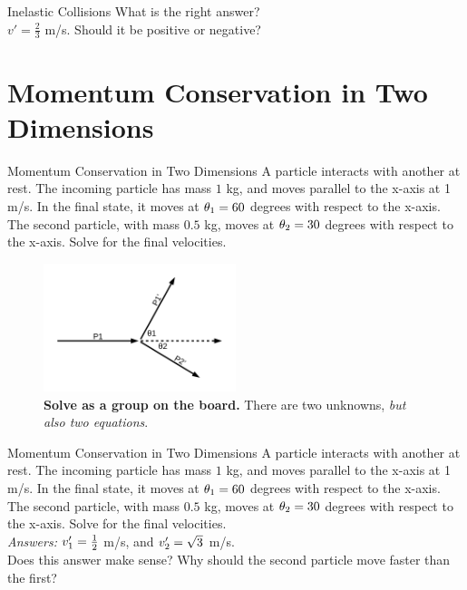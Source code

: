 \documentclass{beamer}
\begin{document}
\begin{frame}{Inelastic Collisions}
What is the right answer? \\ \vspace{0.5cm}
$v' = \frac{2}{3}$ m/s.  Should it be positive or negative?
\end{frame}

\section{Momentum Conservation in Two Dimensions}

\begin{frame}{Momentum Conservation in Two Dimensions}
\small
A particle interacts with another at rest.  The incoming particle has mass $1$ kg, and moves parallel to the x-axis at 1 m/s.  In the final state, it moves at $\theta_{\rm 1} = 60$ degrees with respect to the x-axis.  The second particle, with mass $0.5$ kg, moves at $\theta_{\rm 2} = 30$ degrees with respect to the x-axis.  Solve for the final velocities. \\ \vspace{0.5cm}
\begin{figure}
\centering
\includegraphics[width=0.5\textwidth]{figures/2d_1.pdf}
\caption{\label{fig:2d_1} \textbf{Solve as a group on the board.}  There are two unknowns, \alert{\textit{but also two equations}.}}
\end{figure}
\end{frame}

\begin{frame}{Momentum Conservation in Two Dimensions}
\small
A particle interacts with another at rest.  The incoming particle has mass $1$ kg, and moves parallel to the x-axis at 1 m/s.  In the final state, it moves at $\theta_{\rm 1} = 60$ degrees with respect to the x-axis.  The second particle, with mass $0.5$ kg, moves at $\theta_{\rm 2} = 30$ degrees with respect to the x-axis.  Solve for the final velocities. \\ \vspace{0.5cm}
\textit{Answers:} $v_{\rm 1}' = \frac{1}{2}$ m/s, and $v_{\rm 2}' = \sqrt{3}$ m/s. \\ \vspace{0.5cm}
Does this answer make sense?  Why should the second particle move faster than the first?
\end{frame}
\end{document}
